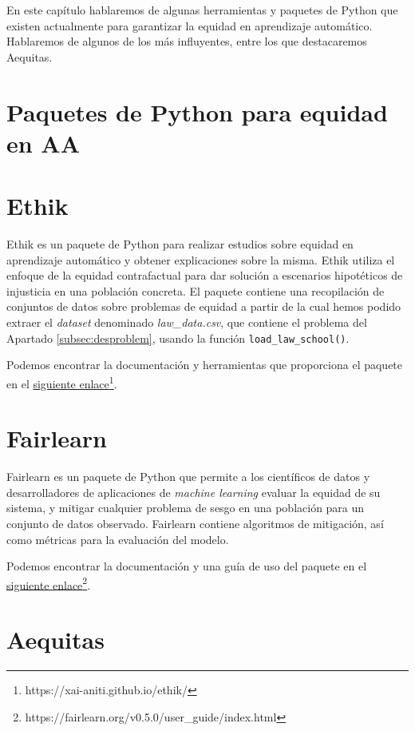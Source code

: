 En este capítulo hablaremos de algunas herramientas y paquetes de Python que existen actualmente para garantizar la equidad en aprendizaje automático. Hablaremos de algunos de los más influyentes, entre los que destacaremos Aequitas. 

\section{Paquetes de Python para equidad en AA}

\section*{Ethik}

Ethik es un paquete de Python para realizar estudios sobre equidad en aprendizaje automático y obtener explicaciones sobre la misma. Ethik utiliza el enfoque de la equidad contrafactual para dar solución a escenarios hipotéticos de injusticia en una población concreta. El paquete contiene una recopilación de conjuntos de datos sobre problemas de equidad a partir de la cual hemos podido extraer el \textit{dataset} denominado \textit{law\_data.csv}, que contiene el problema del Apartado \ref{subsec:desproblem}, usando la función \texttt{load\_law\_school()}.

Podemos encontrar la documentación y herramientas que proporciona el paquete en el \href{https://xai-aniti.github.io/ethik/}{siguiente enlace}\footnote{https://xai-aniti.github.io/ethik/}.

\section*{Fairlearn}

Fairlearn es un paquete de Python que permite a los científicos de datos y desarrolladores de aplicaciones de \textit{machine learning} evaluar la equidad de su sistema, y mitigar cualquier problema de sesgo en una población para un conjunto de datos observado. Fairlearn contiene  algoritmos de mitigación, así como métricas para la evaluación del modelo.

Podemos encontrar la documentación y una guía de uso del paquete en el \href{https://fairlearn.org/v0.5.0/user_guide/index.html}{siguiente enlace}\footnote{https://fairlearn.org/v0.5.0/user\_guide/index.html}.

\section{Aequitas}

